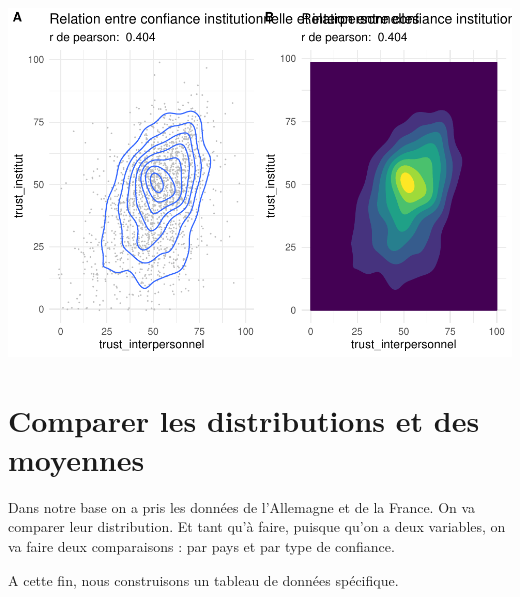 \documentclass[
]{book}
\newenvironment{Shaded}{\begin{snugshade}}{\end{snugshade}}
\newcommand{\CommentTok}[1]{\textcolor[rgb]{0.56,0.35,0.01}{\textit{#1}}}
\newcommand{\KeywordTok}[1]{\textcolor[rgb]{0.13,0.29,0.53}{\textbf{#1}}}
\newcommand{\NormalTok}[1]{#1}
\newcommand{\OperatorTok}[1]{\textcolor[rgb]{0.81,0.36,0.00}{\textbf{#1}}}
\newcommand{\StringTok}[1]{\textcolor[rgb]{0.31,0.60,0.02}{#1}}
\begin{document}
\includegraphics{bookdown-demo_files/figure-latex/416-1.pdf}

\hypertarget{comparer-les-distributions-et-des-moyennes}{%
\section{Comparer les distributions et des moyennes}\label{comparer-les-distributions-et-des-moyennes}}

Dans notre base on a pris les données de l'Allemagne et de la France. On va comparer leur distribution. Et tant qu'à faire, puisque qu'on a deux variables, on va faire deux comparaisons : par pays et par type de confiance.

A cette fin, nous construisons un tableau de données spécifique.

\begin{Shaded}
\end{Shaded}
\end{document}
